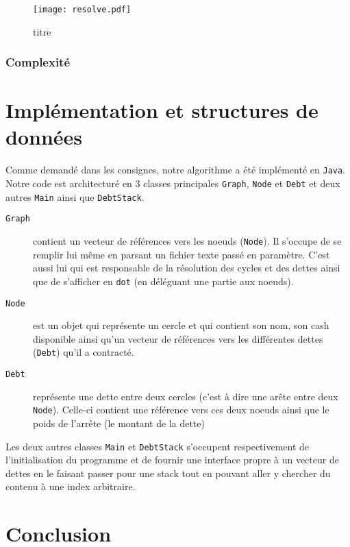 \documentclass[12pt, oneside]{article}
\begin{document}
\begin{figure}[h]
   \caption{\label{resolve} titre}
   \texttt{[image: resolve.pdf]}
\end{figure}
\subsubsection{Complexité}

\section{Implémentation et structures de données}
Comme demandé dans les consignes, notre algorithme a été implémenté en \texttt{Java}. Notre code est architecturé en 3 classes principales \texttt{Graph}, \texttt{Node} et \texttt{Debt} et deux autres \texttt{Main} ainsi que \texttt{DebtStack}.

\begin{description}
\item[\texttt{Graph}] contient un vecteur de références vers les noeuds (\texttt{Node}). Il s'occupe de se remplir lui même en parsant un fichier texte passé en paramètre. C'est aussi lui qui est responsable de la résolution des cycles et des dettes ainsi que de s'afficher en \texttt{dot} (en déléguant une partie aux noeuds).
\item[\texttt{Node}] est un objet qui représente un cercle et qui contient son nom, son cash disponible ainsi qu'un vecteur de références vers les différentes dettes 
(\texttt{Debt}) qu'il a contracté.
\item[\texttt{Debt}] représente une dette entre deux cercles (c'est à dire une arête entre deux \texttt{Node}). Celle-ci contient une référence vers ces deux noeuds ainsi que le poids de l'arrête (le montant de la dette)
\end{description}
Les deux autres classes \texttt{Main} et \texttt{DebtStack} s'occupent respectivement de l'initialisation du programme et de fournir une interface propre à un vecteur de dettes en le faisant passer pour une stack tout en pouvant aller y chercher du contenu à une index arbitraire.

\section{Conclusion}
\end{document}
